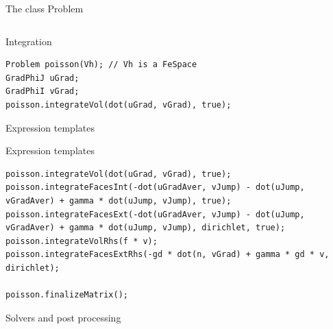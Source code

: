 \documentclass{beamer}
\begin{document}
\begin{frame}{The class Problem}
%		
%		
\begin{columns}
	\begin{column}{0.82\textwidth}
		
	\end{column}
	\begin{column}{0.28\textwidth}
		
	\end{column}
\end{columns}
\end{frame}
\begin{frame}[fragile]{Integration}
\begin{lstlisting}
Problem poisson(Vh); // Vh is a FeSpace
GradPhiJ uGrad;
GradPhiI vGrad;
poisson.integrateVol(dot(uGrad, vGrad), true);
\end{lstlisting}

\end{frame}
\begin{frame}{Expression templates}

\pause

\end{frame}
\begin{frame}[fragile]{Expression templates}

\pause
\begin{lstlisting}
poisson.integrateVol(dot(uGrad, vGrad), true);
poisson.integrateFacesInt(-dot(uGradAver, vJump) - dot(uJump, vGradAver) + gamma * dot(uJump, vJump), true);
poisson.integrateFacesExt(-dot(uGradAver, vJump) - dot(uJump, vGradAver) + gamma * dot(uJump, vJump), dirichlet, true);
poisson.integrateVolRhs(f * v);
poisson.integrateFacesExtRhs(-gd * dot(n, vGrad) + gamma * gd * v, dirichlet);

poisson.finalizeMatrix();
\end{lstlisting}
\end{frame}
\begin{frame}{Solvers and post processing}
\begin{columns}
	\begin{column}{1.15\textwidth}

\end{column}
\end{columns}
\end{frame}
\end{document}
